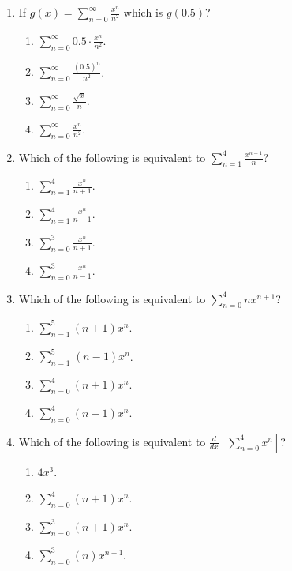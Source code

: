 \documentclass{article}
\begin{document}
\begin{enumerate}
\begin{enumerate}
  \end{enumerate}
  
  
  \item If $g(x)=\sum_{n=0}^\infty \frac{x^n}{n^2}$ which is $g(0.5)$? 
  \begin{enumerate}
    \item $\sum_{n=0}^\infty 0.5\cdot \frac{x^n}{n^2}$.
    \item $\sum_{n=0}^\infty \frac{ (0.5)^n}{n^2}$. %
    \item $\sum_{n=0}^\infty \frac{\sqrt{x}}{n}$.
    \item $\sum_{n=0}^\infty \frac{x^n}{n^2}$.
   
  \end{enumerate}
  
  \item Which of the following is equivalent to $\sum_{n=1}^4 \frac{x^{n-1}}{n}$? 
  \begin{enumerate}
    \item $\sum_{n=1}^4 \frac{x^{n}}{n+1}$.
    \item $\sum_{n=1}^4 \frac{x^{n}}{n-1}$. 
    \item $\sum_{n=0}^3 \frac{x^{n}}{n+1}$.  %
    \item $\sum_{n=0}^3 \frac{x^{n}}{n-1}$. 
   
  \end{enumerate}
  
  
  \newpage
  
  
  \item Which of the following is equivalent to $\sum_{n=0}^4 nx^{n+1}$? 
  \begin{enumerate}
    \item $\sum_{n=1}^5 (n+1)x^{n}$.
    \item $\sum_{n=1}^5_{}_{} (n-1)x^{n}$. %
    \item $\sum_{n=0}^4 (n+1)x^{n}$.
    \item $\sum_{n=0}^4 (n-1)x^{n}$.
   
  \end{enumerate}
  
  
  \item Which of the following is equivalent to $\frac{d}{dx} \left[\sum_{n=0}^4 x^n\right]$? 
  \begin{enumerate}
    \item $4x^3$.
    \item $\sum_{n=0}^4 (n+1)x^n$. 
    \item $\sum_{n=0}^3 (n+1)x^n$. %
    \item $\sum_{n=0}^3 (n)x^{n-1}$. 
   

\end{enumerate}
\end{enumerate}
\end{document}
